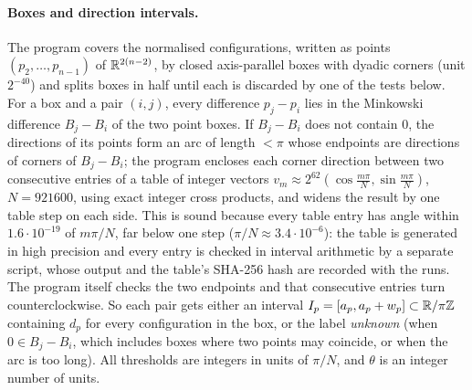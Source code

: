 \paragraph{Boxes and direction intervals.} The program covers the normalised configurations,
written as points $(p_2,\dots,p_{n-1})$ of $\mathbb{R}^{2(n-2)}$, by closed axis-parallel boxes with dyadic corners (unit $2^{-40}$) and splits boxes in
half until each is discarded by one of the tests below. For a box and a pair $(i,j)$, every difference
$p_j-p_i$ lies in the Minkowski difference $B_j-B_i$ of the two point boxes. If $B_j-B_i$ does not contain
$0$, the directions of its points form an arc of length $<\pi$ whose endpoints are directions of corners of
$B_j-B_i$; the program encloses each corner direction between two consecutive entries of a table of integer
vectors $v_m\approx2^{62}(\cos\frac{m\pi}N,\sin\frac{m\pi}N)$, $N=921600$, using exact integer cross products, and
widens the result by one table step on each side. This is sound because every table entry has angle within
$1.6\cdot10^{-19}$ of $m\pi/N$, far below one step ($\pi/N\approx3.4\cdot10^{-6}$): the table is generated in high
precision and every entry is checked in interval arithmetic by a separate script, whose output and the table's
SHA-256 hash are recorded with the runs. The program itself checks the two endpoints and that consecutive entries
turn counterclockwise. So each pair gets either
an interval $I_p=[a_p,a_p+w_p]\subset\mathbb{R}/\pi\mathbb{Z}$ containing $d_p$ for every configuration in the box, or the label
\emph{unknown} (when $0\in B_j-B_i$, which includes boxes where two points may coincide, or when the arc is too
long). All thresholds are integers in units of $\pi/N$, and $\theta$ is an integer number of units.

